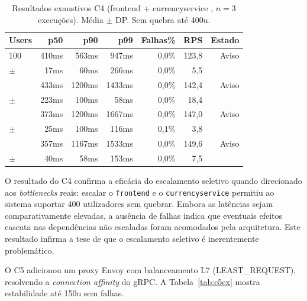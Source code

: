 \documentclass[manuscript,oneside]{acmart}
\begin{document}
\begin{table}[H]
\caption{Resultados exaustivos C4 (frontend  + currencyservice , $n=3$ execuções). Média $\pm$ DP. Sem quebra até 400u.}
\label{tab:c4ex}
\begin{tabular}{lrrrrrr}
\toprule
\textbf{Users} & \textbf{p50} & \textbf{p90} & \textbf{p99} & \textbf{Falhas\%} & \textbf{RPS} & \textbf{Estado} \\
\midrule
100 & 410ms & 563ms & 947ms & 0,0\% & 123,8 & Aviso \\
{\scriptsize$\pm$} & {\scriptsize17ms} & {\scriptsize60ms} & {\scriptsize266ms} & {\scriptsize0,0\%} & {\scriptsize5,5} & \\[-4pt]
\addlinespace[2pt]
200 & 433ms & 1200ms & 1433ms & 0,0\% & 142,4 & Aviso \\
{\scriptsize$\pm$} & {\scriptsize223ms} & {\scriptsize100ms} & {\scriptsize58ms} & {\scriptsize0,0\%} & {\scriptsize18,4} & \\[-4pt]
\addlinespace[2pt]
300 & 373ms & 1200ms & 1667ms & 0,0\% & 147,0 & Aviso \\
{\scriptsize$\pm$} & {\scriptsize25ms} & {\scriptsize100ms} & {\scriptsize116ms} & {\scriptsize0,1\%} & {\scriptsize3,8} & \\[-4pt]
\addlinespace[2pt]
400 & 357ms & 1167ms & 1533ms & 0,0\% & 149,6 & Aviso \\
{\scriptsize$\pm$} & {\scriptsize40ms} & {\scriptsize58ms} & {\scriptsize153ms} & {\scriptsize0,0\%} & {\scriptsize7,5} & \\[-4pt]
\bottomrule
\end{tabular}
\end{table}

O resultado do C4 confirma a eficácia do escalamento seletivo quando direcionado aos \textit{bottlenecks} reais: escalar o \texttt{frontend} e o \texttt{currencyservice} permitiu ao sistema suportar 400 utilizadores sem quebrar. Embora as latências sejam comparativamente elevadas, a ausência de falhas indica que eventuais efeitos cascata nas dependências não escaladas foram acomodados pela arquitetura. Este resultado infirma a tese de que o escalamento seletivo é inerentemente problemático.

O C5 adicionou um proxy Envoy com balanceamento L7 (LEAST\_REQUEST), resolvendo a \textit{connection affinity} do gRPC. A Tabela~\ref{tab:c5ex} mostra estabilidade até 150u sem falhas.
\end{document}
